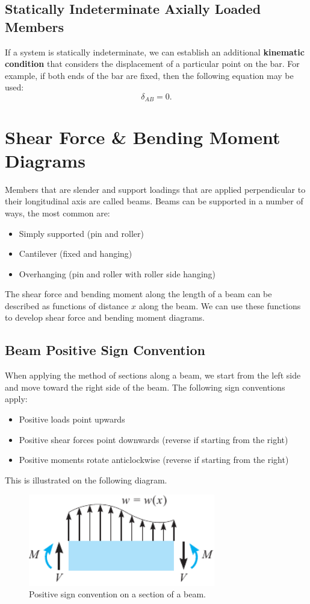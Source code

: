 \documentclass{article}
\begin{document}
\subsection{Statically Indeterminate Axially Loaded Members}
If a system is statically indeterminate, we can establish an additional \textbf{kinematic condition} that considers
the displacement of a particular point on the bar. For example, if both ends of the bar are fixed, then the following
equation may be used:
\begin{equation*}
    \delta_{AB} = 0.
\end{equation*}
\section{Shear Force \& Bending Moment Diagrams}
Members that are slender and support loadings that are applied perpendicular to their longitudinal axis are called
beams. Beams can be supported in a number of ways, the most common are:
\begin{itemize}
    \item Simply supported (pin and roller)
    \item Cantilever (fixed and hanging)
    \item Overhanging (pin and roller with roller side hanging)
\end{itemize}
The shear force and bending moment along the length of a beam can be described as functions of distance \(x\) along the beam.
We can use these functions to develop shear force and bending moment diagrams.
\subsection{Beam Positive Sign Convention}
When applying the method of sections along a beam, we start from the left side and move toward the right side of the beam.
The following sign conventions apply:
\begin{itemize}
    \item Positive loads point upwards
    \item Positive shear forces point downwards (reverse if starting from the right)
    \item Positive moments rotate anticlockwise (reverse if starting from the right)
\end{itemize}
This is illustrated on the following diagram.
\begin{figure}[H]
    \centering
    \includegraphics[height = 4cm, keepaspectratio = true]{figures/sfd_bmd.pdf}
    \caption{Positive sign convention on a section of a beam.} %
\end{figure}
\end{document}

